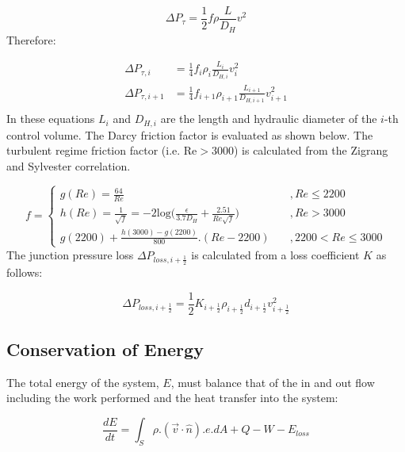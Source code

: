 \documentclass[11pt,letterpaper,titlepage]{article}
\newcommand{\half}{\frac{1}{2}}
\begin{document}
\begin{equation*}
\Delta P_{\tau}=\half f \rho \frac{L}{D_H} v^2
\end{equation*} 
\noindent Therefore:

\begin{equation*}
\begin{aligned}
\Delta P_{\tau,i}&=\frac{1}{4} f_i \rho_i \frac{L_i}{D_{H,i}} v_i^2 \\
\Delta P_{\tau,i+1}&=\frac{1}{4} f_{i+1} \rho_{i+1} \frac{L_{i+1}}{D_{H,i+1}} v_{i+1}^2 \\
\end{aligned}
\end{equation*}
\newline
\noindent
In these equations $L_i$ and $D_{H,i}$ are the length and hydraulic diameter of the $i$-th control volume. The Darcy friction factor is evaluated as shown below. The turbulent regime friction factor (i.e. Re$>$3000) is calculated from the Zigrang and Sylvester correlation.

\begin{equation*}
f=
\begin{cases}
g(Re)=\frac{64}{Re} \quad &,Re\le 2200 \\
h(Re)=\frac{1}{\sqrt{f}}=-2\textrm{log}\biggr( \frac{\epsilon}{3.7D_H}  + \frac{2.51}{Re \sqrt{f}}   \biggr)     \quad &,Re>3000 \\
g(2200)+\frac{h(3000)-g(2200)}{800}. (Re-2200)   \quad &, 2200<Re\le 3000
\end{cases}
\end{equation*}
\newline
The junction pressure loss $\Delta P_{loss,i+\half}$ is calculated from a loss coefficient $K$ as follows:

\begin{equation*}
\Delta P_{loss,i+\half} = \half K_{i+\half} \rho_{i+\half} d_{i+\half} v_{i+\half}^2
\end{equation*}


\newpage
\subsection{Conservation of Energy}
The total energy of the system, $E$, must balance that of the in and out flow including the work performed and the heat transfer into the system:

\begin{equation*}
\frac{dE}{dt}=\int_S \rho.(\vec{v}\cdot \hat{n}).e.dA + Q - W -E_{loss}
\end{equation*}
\end{document}
